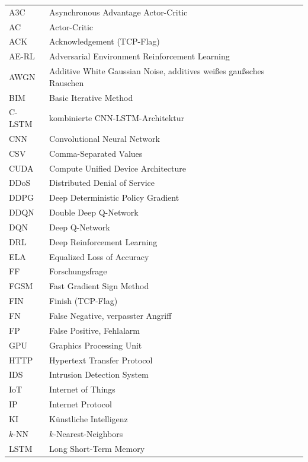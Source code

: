 \begingroup
\renewcommand{\theHtable}{abkverz.\arabic{table}}
\small
\renewcommand{\arraystretch}{1.12}
\begin{longtable}{@{}p{2.3cm}p{12.4cm}@{}}
A3C & Asynchronous Advantage Actor-Critic \\
AC & Actor-Critic \\
ACK & Acknowledgement (TCP-Flag) \\
AE-RL & Adversarial Environment Reinforcement Learning \\
AWGN & Additive White Gaussian Noise, additives weißes gaußsches Rauschen \\
BIM & Basic Iterative Method \\
C-LSTM & kombinierte CNN-LSTM-Architektur \\
CNN & Convolutional Neural Network \\
CSV & Comma-Separated Values \\
CUDA & Compute Unified Device Architecture \\
DDoS & Distributed Denial of Service \\
DDPG & Deep Deterministic Policy Gradient \\
DDQN & Double Deep Q-Network \\
DQN & Deep Q-Network \\
DRL & Deep Reinforcement Learning \\
ELA & Equalized Loss of Accuracy \\
FF & Forschungsfrage \\
FGSM & Fast Gradient Sign Method \\
FIN & Finish (TCP-Flag) \\
FN & False Negative, verpasster Angriff \\
FP & False Positive, Fehlalarm \\
GPU & Graphics Processing Unit \\
HTTP & Hypertext Transfer Protocol \\
IDS & Intrusion Detection System \\
IoT & Internet of Things \\
IP & Internet Protocol \\
KI & Künstliche Intelligenz \\
$k$-NN & $k$-Nearest-Neighbors \\
LSTM & Long Short-Term Memory \\

\end{longtable}
